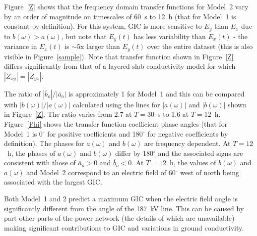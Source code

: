 \documentclass[draft,linenumbers]{agujournal2018}
\begin{document}
Figure~\ref{Z} shows that the frequency domain transfer functions for Model~2 vary by an order of magnitude on timescales of 60~s to 12~h (that for Model~1 is constant by definition). For this system, GIC is more sensitive to $E_y$ than $E_x$ due to $b(\omega) > a(\omega)$, but note that $E_y(t)$ has less variability than $E_x(t)$ - the variance in $E_x(t)$ is $\sim$5x larger than $E_y(t)$ over the entire dataset (this is also visible in Figure~\ref{sample}). Note that transfer function shown in Figure~\ref{Z} differs significantly from that of a layered slab conductivity model for which $|Z_{xy}|=|Z_{yx}|$.

The ratio of $|\overline{b}_o|/|\overline{a}_o|$ is approximately 1 for Model~1 and this can be compared with $|b(\omega)|/|a(\omega)|$ calculated using the lines for $|a(\omega)|$ and $|b(\omega)|$ shown in Figure~\ref{Z}. The ratio varies from 2.7 at $T=30$~s to 1.6 at $T=12$~h. 
Figure~\ref{Phi} shows the transfer function coefficient phase angles (that for Model~1 is 0$^{\circ}$ for positive coefficients and 180$^{\circ}$ for negative coefficients by definition). The phases for $a(\omega)$ and $b(\omega)$ are frequency dependent. At $T=12$~h, the phases of $a(\omega)$ and $b(\omega)$ differ by 180$^{\circ}$ and the associated signs are consistent with those of $\overline{a}_o > 0$ and $\overline{b}_o < 0$. At $T=12$~h, the values of $b(\omega)$ and $a(\omega)$ and Model~2 correspond to an electric field of 60$^{\circ}$ west of north being associated with the largest GIC.

Both Model~1 and 2 predict a maximum GIC when the electric field angle is significantly different from the angle of the 187~kV line. This can be caused by part other parts of the power network (the details of which are unavailable) making significant contributions to GIC and variations in ground conductivity. 
\end{document}
